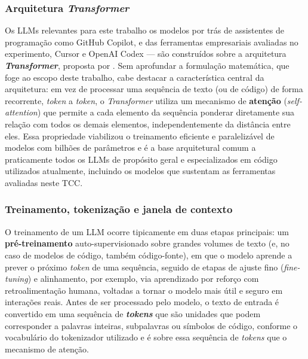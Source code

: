 \subsubsection{Arquitetura \textit{Transformer}}\label{subsubsec:transformer}
Os LLMs relevantes para este trabalho os modelos por trás de assistentes de programação como GitHub Copilot, e das ferramentas empresariais avaliadas no experimento, Cursor e OpenAI Codex — são construídos sobre a arquitetura \textbf{\textit{Transformer}}, proposta por . Sem aprofundar a formulação matemática, que foge ao escopo deste trabalho, cabe destacar a característica central da arquitetura: em vez de processar uma sequência de texto (ou de código) de forma recorrente, \textit{token} a \textit{token}, o \textit{Transformer} utiliza um mecanismo de \textbf{atenção} (\textit{self-attention}) que permite a cada elemento da sequência ponderar diretamente sua relação com todos os demais elementos, independentemente da distância entre eles. Essa propriedade viabilizou o treinamento eficiente e paralelizável de modelos com bilhões de parâmetros e é a base arquitetural comum a praticamente todos os LLMs de propósito geral e especializados em código utilizados atualmente, incluindo os modelos que sustentam as ferramentas avaliadas neste TCC.

\subsubsection{Treinamento, tokenização e janela de contexto}\label{subsubsec:tokenizacao-contexto}
O treinamento de um LLM ocorre tipicamente em duas etapas principais: um \textbf{pré-treinamento} auto-supervisionado sobre grandes volumes de texto (e, no caso de modelos de código, também código-fonte), em que o modelo aprende a prever o próximo \textit{token} de uma sequência, seguido de etapas de ajuste fino (\textit{fine-tuning}) e alinhamento, por exemplo, via aprendizado por reforço com retroalimentação humana, voltadas a tornar o modelo mais útil e seguro em interações reais. Antes de ser processado pelo modelo, o texto de entrada é convertido em uma sequência de \textbf{\textit{tokens}} que são unidades que podem corresponder a palavras inteiras, subpalavras ou símbolos de código, conforme o vocabulário do tokenizador utilizado e é sobre essa sequência de \textit{tokens} que o mecanismo de atenção.


